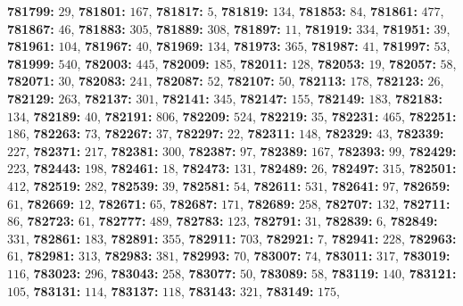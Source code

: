 \textsf{\bfseries 781799:} $29$, \textsf{\bfseries 781801:} $167$, \textsf{\bfseries 781817:} $5$, \textsf{\bfseries 781819:} $134$, \textsf{\bfseries 781853:} $84$, \textsf{\bfseries 781861:} $477$, \textsf{\bfseries 781867:} $46$, \textsf{\bfseries 781883:} $305$, \textsf{\bfseries 781889:} $308$, \textsf{\bfseries 781897:} $11$, \textsf{\bfseries 781919:} $334$, \textsf{\bfseries 781951:} $39$, \textsf{\bfseries 781961:} $104$, \textsf{\bfseries 781967:} $40$, \textsf{\bfseries 781969:} $134$, \textsf{\bfseries 781973:} $365$, \textsf{\bfseries 781987:} $41$, \textsf{\bfseries 781997:} $53$, \textsf{\bfseries 781999:} $540$, \textsf{\bfseries 782003:} $445$, \textsf{\bfseries 782009:} $185$, \textsf{\bfseries 782011:} $128$, \textsf{\bfseries 782053:} $19$, \textsf{\bfseries 782057:} $58$, \textsf{\bfseries 782071:} $30$, \textsf{\bfseries 782083:} $241$, \textsf{\bfseries 782087:} $52$, \textsf{\bfseries 782107:} $50$, \textsf{\bfseries 782113:} $178$, \textsf{\bfseries 782123:} $26$, \textsf{\bfseries 782129:} $263$, \textsf{\bfseries 782137:} $301$, \textsf{\bfseries 782141:} $345$, \textsf{\bfseries 782147:} $155$, \textsf{\bfseries 782149:} $183$, \textsf{\bfseries 782183:} $134$, \textsf{\bfseries 782189:} $40$, \textsf{\bfseries 782191:} $806$, \textsf{\bfseries 782209:} $524$, \textsf{\bfseries 782219:} $35$, \textsf{\bfseries 782231:} $465$, \textsf{\bfseries 782251:} $186$, \textsf{\bfseries 782263:} $73$, \textsf{\bfseries 782267:} $37$, \textsf{\bfseries 782297:} $22$, \textsf{\bfseries 782311:} $148$, \textsf{\bfseries 782329:} $43$, \textsf{\bfseries 782339:} $227$, \textsf{\bfseries 782371:} $217$, \textsf{\bfseries 782381:} $300$, \textsf{\bfseries 782387:} $97$, \textsf{\bfseries 782389:} $167$, \textsf{\bfseries 782393:} $99$, \textsf{\bfseries 782429:} $223$, \textsf{\bfseries 782443:} $198$, \textsf{\bfseries 782461:} $18$, \textsf{\bfseries 782473:} $131$, \textsf{\bfseries 782489:} $26$, \textsf{\bfseries 782497:} $315$, \textsf{\bfseries 782501:} $412$, \textsf{\bfseries 782519:} $282$, \textsf{\bfseries 782539:} $39$, \textsf{\bfseries 782581:} $54$, \textsf{\bfseries 782611:} $531$, \textsf{\bfseries 782641:} $97$, \textsf{\bfseries 782659:} $61$, \textsf{\bfseries 782669:} $12$, \textsf{\bfseries 782671:} $65$, \textsf{\bfseries 782687:} $171$, \textsf{\bfseries 782689:} $258$, \textsf{\bfseries 782707:} $132$, \textsf{\bfseries 782711:} $86$, \textsf{\bfseries 782723:} $61$, \textsf{\bfseries 782777:} $489$, \textsf{\bfseries 782783:} $123$, \textsf{\bfseries 782791:} $31$, \textsf{\bfseries 782839:} $6$, \textsf{\bfseries 782849:} $331$, \textsf{\bfseries 782861:} $183$, \textsf{\bfseries 782891:} $355$, \textsf{\bfseries 782911:} $703$, \textsf{\bfseries 782921:} $7$, \textsf{\bfseries 782941:} $228$, \textsf{\bfseries 782963:} $61$, \textsf{\bfseries 782981:} $313$, \textsf{\bfseries 782983:} $381$, \textsf{\bfseries 782993:} $70$, \textsf{\bfseries 783007:} $74$, \textsf{\bfseries 783011:} $317$, \textsf{\bfseries 783019:} $116$, \textsf{\bfseries 783023:} $296$, \textsf{\bfseries 783043:} $258$, \textsf{\bfseries 783077:} $50$, \textsf{\bfseries 783089:} $58$, \textsf{\bfseries 783119:} $140$, \textsf{\bfseries 783121:} $105$, \textsf{\bfseries 783131:} $114$, \textsf{\bfseries 783137:} $118$, \textsf{\bfseries 783143:} $321$, \textsf{\bfseries 783149:} $175$, 
